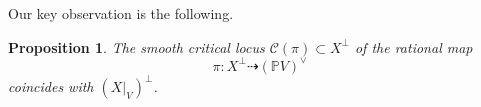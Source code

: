 \documentclass[12pt]{amsart}
\newtheorem{proposition}[theorem]{Proposition}
\begin{document}


Our key observation is the following.
\begin{proposition}\label{prop_critical-locus}
The smooth critical locus $\mathcal C(\pi)\subset X^\perp$ of the rational map
\[
\pi:X^\perp\dashrightarrow (\mathbb PV)^\vee
\]
coincides with $(X|_V)^\perp$.
\end{proposition}
\end{document}
